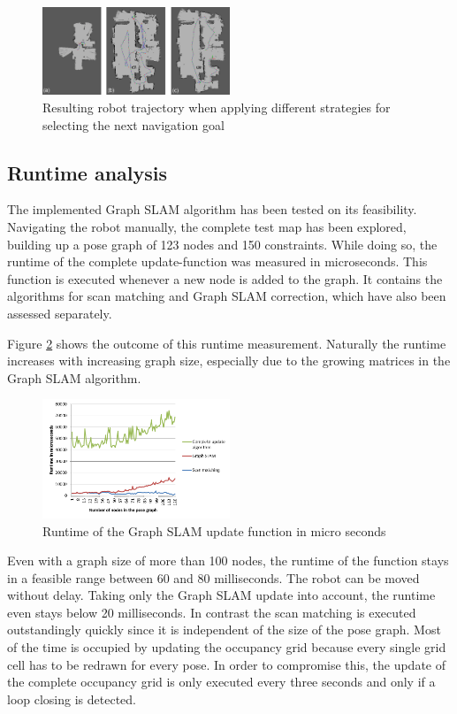 \documentclass{ba-kecs}
\begin{document}
\begin{figure}[htbp]
	\centering
		\includegraphics[width=0.50\textwidth]{figures/Navigation_comparison.jpg}
	\caption{Resulting robot trajectory when applying different strategies for selecting the next navigation goal}
	\label{fig:navigation_comparison}
\end{figure}

\subsection{Runtime analysis}
\label{sec:runtime}
The implemented Graph SLAM algorithm has been tested on its feasibility. Navigating the robot manually, the complete test map has been explored, building up a pose graph of 123 nodes and 150 constraints. While doing so, the runtime of the complete update-function was measured in microseconds. This function is executed whenever a new node is added to the graph. It contains the algorithms for scan matching and Graph SLAM correction, which have also been assessed separately.

Figure \ref{fig:runtime} shows the outcome of this runtime measurement. Naturally the runtime increases with increasing graph size, especially due to the growing matrices in the Graph SLAM algorithm.

\begin{figure}[htbp]
	\centering
		\includegraphics[width=0.50\textwidth]{figures/Runtime.png}
	\caption{Runtime of the Graph SLAM update function in micro seconds}
	\label{fig:runtime}
\end{figure}

Even with a graph size of more than 100 nodes, the runtime of the function stays in a feasible range between 60 and 80 milliseconds. The robot can be moved without delay. Taking only the Graph SLAM update into account, the runtime even stays below 20 milliseconds. In contrast the scan matching is executed outstandingly quickly since it is independent of the size of the pose graph. Most of the time is occupied by updating the occupancy grid because every single grid cell has to be redrawn for every pose. In order to compromise this, the update of the complete occupancy grid is only executed every three seconds and only if a loop closing is detected.
\end{document}
